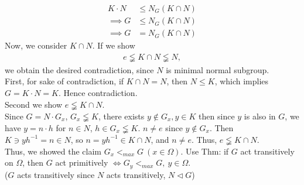 \documentclass{article}
\begin{document}
\begin{homeworkProblem}
    \begin{align}
        K \cdot N &\leq N_G(K \cap N)\\
        \implies G &\leq N_G(K \cap N)\\ 
        \implies G &= N_G(K \cap N)
    \end{align}
    Now, we consider $K \cap N$. If we show 
    \begin{align}
        e \lneqq K \cap N \lneqq N,
    \end{align}
    we obtain the desired contradiction, since $N$ is minimal normal subgroup.\\
    First, for sake of contradiction, if $K \cap N = N$, then $N \leq K$,
    which implies $G = K \cdot N =K$. Hence contradiction.\\
    Second we show $e \lneqq K \cap N$.\\
    Since $G = N \cdot G_x$, $G_x \lneqq K$, there exists $y \not\in G_x, y \in K$
    then since $y$ is also in $G$, we have $y = n \cdot h$ for $n \in N$,
    $h \in G_x \lneqq K$. $n \neq e$ since $y \not\in G_x$.
    Then $K \ni y h^{-1} = n \in N$, so $n = yh^{-1} \in K \cap N$,
    and $n \neq e$. Thus, $e \lneqq K \cap N$.\\

    Thus, we showed the claim $G_x <_{max} G \ (x \in \Omega)$.
    Use Thm: if $G$ act transitively on $\Omega$,
    then $G$ act primitively $\Leftrightarrow G_y <_{max} G, \ y \in \Omega$.\\
    ($G$ acts transitively since $N$ acts transitively, $N \lhd G$)\\

    
    
    
\end{homeworkProblem}
\end{document}
